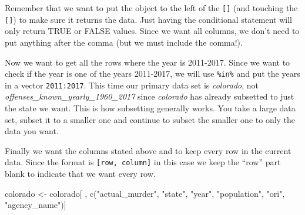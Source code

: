 \documentclass[
  12pt,
]{book}
\newenvironment{Shaded}{\begin{snugshade}}{\end{snugshade}}
\newcommand{\DecValTok}[1]{\textcolor[rgb]{0.06,0.06,0.06}{#1}}
\newcommand{\FunctionTok}[1]{\textcolor[rgb]{0,0,0}{#1}}
\newcommand{\NormalTok}[1]{#1}
\newcommand{\OtherTok}[1]{\textcolor[rgb]{0.37,0.37,0.37}{#1}}
\newcommand{\SpecialCharTok}[1]{\textcolor[rgb]{0,0,0}{#1}}
\newcommand{\StringTok}[1]{\textcolor[rgb]{0.5,0.5,0.5}{#1}}
\begin{document}
Remember that we want to put the object to the left of the \texttt{{[}{]}} (and touching the \texttt{{[}{]}}) to make sure it returns the data. Just having the conditional statement will only return TRUE or FALSE values. Since we want all columns, we don't need to put anything after the comma (but we must include the comma!).

\begin{Shaded}
\end{Shaded}

Now we want to get all the rows where the year is 2011-2017. Since we want to check if the year is one of the years 2011-2017, we will use \texttt{\%in\%} and put the years in a vector \texttt{2011:2017}. This time our primary data set is \emph{colorado}, not \emph{offenses\_known\_yearly\_1960\_2017} since \emph{colorado} has already subsetted to just the state we want. This is how subsetting generally works. You take a large data set, subset it to a smaller one and continue to subset the smaller one to only the data you want.

\begin{Shaded}
\end{Shaded}

Finally we want the columns stated above and to keep every row in the current data. Since the format is \texttt{{[}row,\ column{]}} in this case we keep the ``row'' part blank to indicate that we want every row.

\begin{Shaded}
\begin{Highlighting}[]
\NormalTok{colorado }\OtherTok{\textless{}{-}}\NormalTok{ colorado[ , }\FunctionTok{c}\NormalTok{(}\StringTok{"actual\_murder"}\NormalTok{, }\StringTok{"state"}\NormalTok{, }\StringTok{"year"}\NormalTok{, }\StringTok{"population"}\NormalTok{, }\StringTok{"ori"}\NormalTok{, }\StringTok{"agency\_name"}\NormalTok{)]}
\end{Highlighting}
\end{Shaded}
\end{document}
